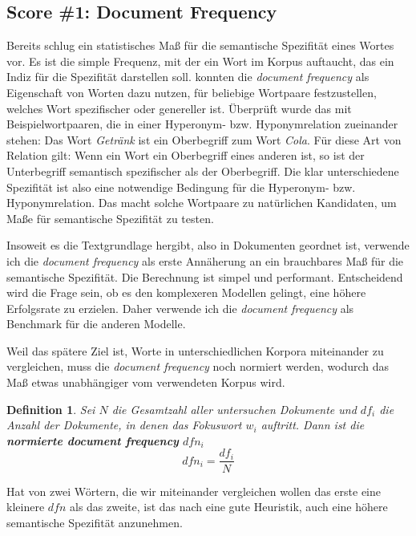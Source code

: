 \documentclass[11pt,numbers=noenddot]{scrartcl}
\newtheorem*{defi}{Definition}
\begin{document}
\subsection{Score \#1: Document Frequency}
Bereits \citet{sparckjones1972} schlug ein statistisches Maß für die semantische Spezifität eines Wortes vor. Es ist die simple Frequenz, mit der ein Wort im Korpus auftaucht, das ein Indiz für die Spezifität darstellen soll. \citet{Caraballo99determiningthe} konnten die \emph{document frequency} als Eigenschaft von Worten dazu nutzen, für beliebige Wortpaare festzustellen, welches Wort  spezifischer oder genereller ist. Überprüft wurde das mit Beispielwortpaaren, die in einer Hyperonym- bzw. Hyponymrelation zueinander stehen: Das Wort \emph{Getränk} ist ein Oberbegriff zum Wort \emph{Cola}. Für diese Art von Relation gilt: Wenn ein Wort ein Oberbegriff eines anderen ist, so ist der Unterbegriff semantisch spezifischer als der Oberbegriff. Die klar unterschiedene Spezifität ist also eine notwendige Bedingung für die Hyperonym- bzw. Hyponymrelation. Das macht solche Wortpaare zu natürlichen Kandidaten, um Maße für semantische Spezifität zu testen.

Insoweit es die Textgrundlage hergibt, also in Dokumenten geordnet ist, verwende ich die \emph{document frequency} als erste Annäherung an ein brauchbares Maß für die semantische Spezifität. Die Berechnung ist simpel und performant. Entscheidend wird die Frage sein, ob es den komplexeren Modellen gelingt, eine höhere Erfolgsrate zu erzielen. Daher verwende ich die \emph{document frequency} als Benchmark für die anderen Modelle.

Weil das spätere Ziel ist, Worte in unterschiedlichen Korpora miteinander zu vergleichen, muss die \emph{document frequency} noch normiert werden, wodurch das Maß etwas unabhängiger vom verwendeten Korpus wird.

\begin{defi}
Sei $N$ die Gesamtzahl aller untersuchen Dokumente und $df_i$ die Anzahl der Dokumente, in denen das Fokuswort $w_i$ auftritt. Dann ist die \textbf{normierte document frequency} $dfn_i$
\begin{equation}
    dfn_i = \frac{df_i}{N}
\end{equation}
\end{defi}

Hat von zwei Wörtern, die wir miteinander vergleichen wollen das erste eine kleinere $dfn$ als das zweite, ist das nach \citet{Caraballo99determiningthe} eine gute Heuristik, auch eine höhere semantische Spezifität anzunehmen.
\end{document}
